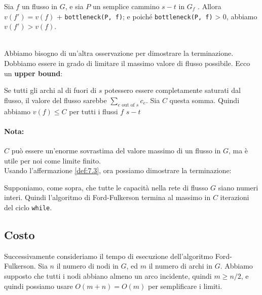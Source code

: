 \begin{minipage}{\textwidth}
  \begin{myblockquote}
    \begin{definition}\label{def:7.3}
      Sia $f$ un flusso in $G$, e sia $P$ un semplice cammino $s-t$ in
      $G_f$ . Allora $v(f') = v(f)$ + \texttt{bottleneck(P,\ f)}; e poiché
      \texttt{bottleneck(P,\ f)} \textgreater{} 0, abbiamo $v(f') > v(f)$.
    \end{definition}
  \end{myblockquote}
\end{minipage}\\

Abbiamo bisogno di un'altra osservazione per dimostrare la terminazione.
Dobbiamo essere in grado di limitare il massimo valore di flusso
possibile. Ecco un \textbf{upper bound}:

\begin{myblockquote}
  Se tutti gli archi al di
  fuori di $s$ potessero essere completamente saturati dal flusso, il
  valore del flusso sarebbe $\sum_{e \text{ out of }s} c_e$. Sia $C$
  questa somma. Quindi abbiamo $v(f) \le C$ per tutti i flussi $f$
  $s-t$
\end{myblockquote}

\paragraph*{Nota:} $C$ può essere un'enorme sovrastima del valore massimo
di un flusso in $G$, ma è utile per noi come limite finito.\\

Usando l'affermazione \ref{def:7.3}, ora possiamo dimostrare la terminazione:

\begin{myblockquote}
  Supponiamo, come sopra, che tutte le capacità nella rete
  di flusso $G$ siano numeri interi. Quindi l'algoritmo di
  Ford-Fulkerson termina al massimo in $C$ iterazioni del ciclo
  \texttt{while}.
\end{myblockquote}


\subsection{Costo}

Successivamente consideriamo il tempo di esecuzione dell'algoritmo
Ford-Fulkerson. Sia $n$ il numero di nodi in $G$, ed $m$ il numero
di archi in $G$. Abbiamo supposto che tutti i nodi abbiano almeno un
arco incidente, quindi $m \ge n/2$, e quindi possiamo usare
$O(m + n ) = O(m)$ per semplificare i limiti.

